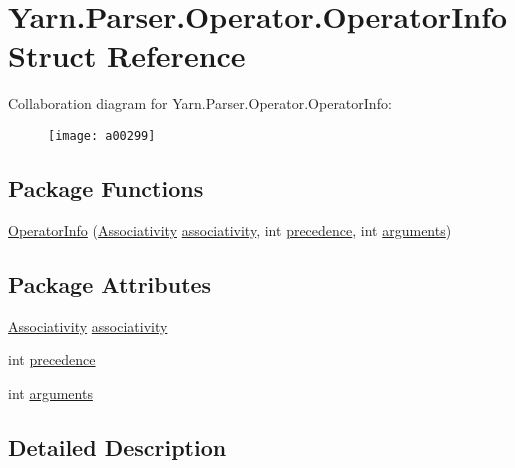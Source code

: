 \hypertarget{a00073}{\section{Yarn.\-Parser.\-Operator.\-Operator\-Info Struct Reference}
\label{a00073}
}


Collaboration diagram for Yarn.\-Parser.\-Operator.\-Operator\-Info\-:
\nopagebreak
\begin{figure}[H]
\begin{center}
\leavevmode
\texttt{[image: a00299]}
\end{center}
\end{figure}
\subsection*{Package Functions}
\begin{DoxyCompactItemize}
\item 
\hyperlink{a00073_a25faca62235c9f8542e4a071ba8ebc0b}{Operator\-Info} (\hyperlink{a00072_a83fa1b8db0e6678006920812b6f33f62}{Associativity} \hyperlink{a00073_accba40a72d9709ca3c18810b8661afe3}{associativity}, int \hyperlink{a00073_a0b2921d7b863e268d33aa15213395093}{precedence}, int \hyperlink{a00073_a0758c6f7dac4b205f616b43b1af95b95}{arguments})
\end{DoxyCompactItemize}
\subsection*{Package Attributes}
\begin{DoxyCompactItemize}
\item 
\hyperlink{a00072_a83fa1b8db0e6678006920812b6f33f62}{Associativity} \hyperlink{a00073_accba40a72d9709ca3c18810b8661afe3}{associativity}
\item 
int \hyperlink{a00073_a0b2921d7b863e268d33aa15213395093}{precedence}
\item 
int \hyperlink{a00073_a0758c6f7dac4b205f616b43b1af95b95}{arguments}
\end{DoxyCompactItemize}


\subsection{Detailed Description}


